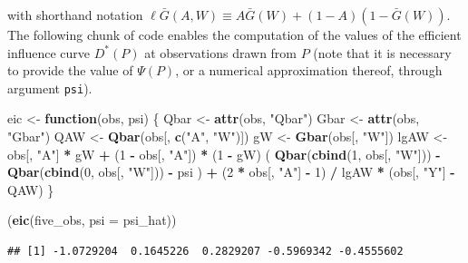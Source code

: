 \documentclass[]{article}
\newenvironment{Shaded}{\begin{snugshade}}{\end{snugshade}}
\newcommand{\ControlFlowTok}[1]{\textcolor[rgb]{0.13,0.29,0.53}{\textbf{#1}}}
\newcommand{\DataTypeTok}[1]{\textcolor[rgb]{0.13,0.29,0.53}{#1}}
\newcommand{\DecValTok}[1]{\textcolor[rgb]{0.00,0.00,0.81}{#1}}
\newcommand{\KeywordTok}[1]{\textcolor[rgb]{0.13,0.29,0.53}{\textbf{#1}}}
\newcommand{\NormalTok}[1]{#1}
\newcommand{\OperatorTok}[1]{\textcolor[rgb]{0.81,0.36,0.00}{\textbf{#1}}}
\newcommand{\StringTok}[1]{\textcolor[rgb]{0.31,0.60,0.02}{#1}}
\newcommand{\Gbar}{\bar{G}}
\theoremstyle{definition}
\theoremstyle{definition}
\theoremstyle{definition}
\theoremstyle{remark}
\begin{document}
with shorthand notation
\(\ell\Gbar(A,W) \equiv A\Gbar(W) + (1-A) (1-\Gbar(W))\). The following
chunk of code enables the computation of the values of the efficient
influence curve \(D^{*}(P)\) at observations drawn from \(P\) (note that
it is necessary to provide the value of \(\Psi(P)\), or a numerical
approximation thereof, through argument \texttt{psi}).

\begin{Shaded}
\begin{Highlighting}[]
\NormalTok{eic <-}\StringTok{ }\ControlFlowTok{function}\NormalTok{(obs, psi) \{}
\NormalTok{  Qbar <-}\StringTok{ }\KeywordTok{attr}\NormalTok{(obs, }\StringTok{"Qbar"}\NormalTok{)}
\NormalTok{  Gbar <-}\StringTok{ }\KeywordTok{attr}\NormalTok{(obs, }\StringTok{"Gbar"}\NormalTok{)}
\NormalTok{  QAW <-}\StringTok{ }\KeywordTok{Qbar}\NormalTok{(obs[, }\KeywordTok{c}\NormalTok{(}\StringTok{"A"}\NormalTok{, }\StringTok{"W"}\NormalTok{)])}
\NormalTok{  gW <-}\StringTok{ }\KeywordTok{Gbar}\NormalTok{(obs[, }\StringTok{"W"}\NormalTok{])}
\NormalTok{  lgAW <-}\StringTok{ }\NormalTok{obs[, }\StringTok{"A"}\NormalTok{] }\OperatorTok{*}\StringTok{ }\NormalTok{gW }\OperatorTok{+}\StringTok{ }\NormalTok{(}\DecValTok{1} \OperatorTok{-}\StringTok{ }\NormalTok{obs[, }\StringTok{"A"}\NormalTok{]) }\OperatorTok{*}\StringTok{ }\NormalTok{(}\DecValTok{1} \OperatorTok{-}\StringTok{ }\NormalTok{gW)}
\NormalTok{  ( }\KeywordTok{Qbar}\NormalTok{(}\KeywordTok{cbind}\NormalTok{(}\DecValTok{1}\NormalTok{, obs[, }\StringTok{"W"}\NormalTok{])) }\OperatorTok{-}\StringTok{ }\KeywordTok{Qbar}\NormalTok{(}\KeywordTok{cbind}\NormalTok{(}\DecValTok{0}\NormalTok{, obs[, }\StringTok{"W"}\NormalTok{])) }\OperatorTok{-}\StringTok{ }\NormalTok{psi ) }\OperatorTok{+}
\StringTok{    }\NormalTok{(}\DecValTok{2} \OperatorTok{*}\StringTok{ }\NormalTok{obs[, }\StringTok{"A"}\NormalTok{] }\OperatorTok{-}\StringTok{ }\DecValTok{1}\NormalTok{) }\OperatorTok{/}\StringTok{ }\NormalTok{lgAW }\OperatorTok{*}\StringTok{ }\NormalTok{(obs[, }\StringTok{"Y"}\NormalTok{] }\OperatorTok{-}\StringTok{ }\NormalTok{QAW)}
\NormalTok{\}}

\NormalTok{(}\KeywordTok{eic}\NormalTok{(five_obs, }\DataTypeTok{psi =}\NormalTok{ psi_hat))}
\end{Highlighting}
\end{Shaded}

\begin{verbatim}
## [1] -1.0729204  0.1645226  0.2829207 -0.5969342 -0.4555602
\end{verbatim}
\end{document}
